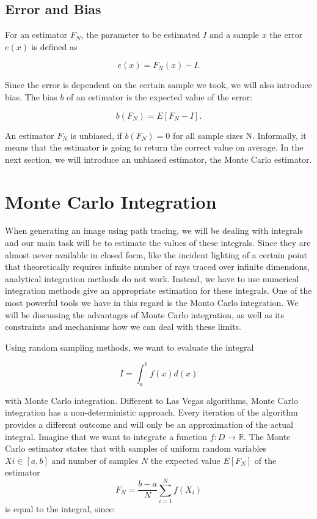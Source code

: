 \subsection{Error and Bias} 

For an estimator $F_N$, the parameter to be estimated $I$ and a sample $x$ the error $e(x)$ is defined as

\begin{equation}
e(x) = F_N(x) - I.
\end{equation}

Since the error is dependent on the certain sample we took, we will also introduce bias. The bias $b$ of an estimator is the expected value of the error:

\begin{equation}
b(F_N) = E[F_N - I].
\end{equation}

An estimator $F_N$ is unbiased, if $b(F_N) = 0$ for all sample sizes N. Informally, it means that the estimator is going to return the correct value on average. In the next section, we will introduce an unbiased estimator, the Monte Carlo estimator.

\section{Monte Carlo Integration}
\label{ch:preliminaries:mci}

When generating an image using path tracing, we will be dealing with integrals and our main task will be to estimate the values of these integrals. Since they are almost never available in closed form, like the incident lighting of a certain point that theoretically requires infinite number of rays traced over infinite dimensions, analytical integration methods do not work. Instead, we have to use numerical integration methods give an appropriate estimation for these integrals. One of the most powerful tools we have in this regard is the Monto Carlo integration. We will be discussing the advantages of Monte Carlo integration, as well as its constraints and mechanisms how we can deal with these limits.

Using random sampling methods, we want to evaluate the integral 

\begin{equation}
I = \int_{a}^{b}f(x)d(x)
\end{equation}

with Monte Carlo integration. Different to Las Vegas algorithms, Monte Carlo integration has a non-deterministic approach. Every iteration of the algorithm provides a different outcome and will only be an approximation of the actual integral. Imagine that we want to integrate a function $f:D \rightarrow \mathbb{R}$. The Monte Carlo estimator states that with samples of uniform random variables $Xi \in [a,b]$ and number of samples $N$ the expected value $E[F_N]$ of the estimator 
\begin{equation}
F_N = \frac{b-a}{N}\sum_{i = 1}^{N}f(X_i)
\end{equation}
is equal to the integral, since:

